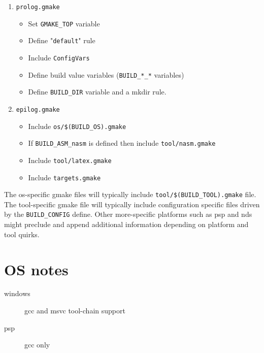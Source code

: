 \documentclass{article}
\newcommand{\var}[1]{{\tt #1}}
\newcommand{\val}[1]{"{\tt #1}"}
\newcommand{\file}[1]{{\tt #1}}
\begin{document}
\begin{enumerate}
\item \file{prolog.gmake}
\begin{itemize}
\item Set \var{GMAKE\_TOP} variable
\item Define \val{default} rule
\item Include \file{ConfigVars}
\item Define build value variables (\var{BUILD\_*\_*} variables)
\item Define \var{BUILD\_DIR} variable and a mkdir rule.
\end{itemize}
\item \file{epilog.gmake}
\begin{itemize}
\item Include \file{os/\$(\var{BUILD\_OS}).gmake}
\item If \var{BUILD\_ASM\_nasm} is defined then include \file{tool/nasm.gmake}
\item Include \file{tool/latex.gmake}
\item Include \file{targets.gmake}
\end{itemize}
\end{enumerate}

The os-specific gmake files will typically include 
\file{tool/\$(\var{BUILD\_TOOL}).gmake} file. 
The tool-specific gmake file will typically include configuration specific files driven by the \var{BUILD\_CONFIG} define.
Other more-specific platforms such as psp and nds might preclude and append additional information
depending on platform and tool quirks.

\section{OS notes}

\begin{description}
\item [windows] gcc and msvc tool-chain support
\item [psp] gcc only
\end{description}
\end{document}
